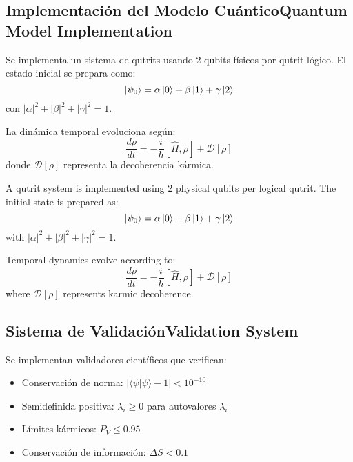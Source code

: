 \documentclass[12pt,a4paper]{article}
\newcommand{\es}[1]{\foreignlanguage{spanish}{#1}}
\newcommand{\en}[1]{\foreignlanguage{english}{#1}}
\begin{document}
\subsection{\es{Implementación del Modelo Cuántico}\en{Quantum Model Implementation}}

\begin{otherlanguage}{spanish}
Se implementa un sistema de qutrits usando 2 qubits físicos por qutrit lógico. El estado inicial se prepara como:
\begin{equation}
\ket{\psi_0} = \alpha\ket{0} + \beta\ket{1} + \gamma\ket{2}
\end{equation}
con $|\alpha|^2 + |\beta|^2 + |\gamma|^2 = 1$.

La dinámica temporal evoluciona según:
\begin{equation}
\frac{d\rho}{dt} = -\frac{i}{\hbar}[\hat{H}, \rho] + \mathcal{D}[\rho]
\end{equation}
donde $\mathcal{D}[\rho]$ representa la decoherencia kármica.
\end{otherlanguage}

\begin{otherlanguage}{english}
A qutrit system is implemented using 2 physical qubits per logical qutrit. The initial state is prepared as:
\begin{equation}
\ket{\psi_0} = \alpha\ket{0} + \beta\ket{1} + \gamma\ket{2}
\end{equation}
with $|\alpha|^2 + |\beta|^2 + |\gamma|^2 = 1$.

Temporal dynamics evolve according to:
\begin{equation}
\frac{d\rho}{dt} = -\frac{i}{\hbar}[\hat{H}, \rho] + \mathcal{D}[\rho]
\end{equation}
where $\mathcal{D}[\rho]$ represents karmic decoherence.
\end{otherlanguage}

\subsection{\es{Sistema de Validación}\en{Validation System}}

\begin{otherlanguage}{spanish}
Se implementan validadores científicos que verifican:
\begin{itemize}
\item Conservación de norma: $|\langle\psi|\psi\rangle - 1| < 10^{-10}$
\item Semidefinida positiva: $\lambda_i \geq 0$ para autovalores $\lambda_i$
\item Límites kármicos: $P_V \leq 0.95$
\item Conservación de información: $\Delta S < 0.1$
\end{itemize}
\end{otherlanguage}
\end{document}
